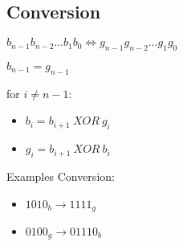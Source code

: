 \documentclass[11pt]{article}
\begin{document}
\subsection{Conversion}

$ b_{n - 1} b_{n - 2} \dots b_{1} b_0 \Longleftrightarrow g_{n - 1} g_{n - 2} \dots g_{1} g_0 $

$ b_{n - 1} = g_{n - 1} $ \newline

for $ i \neq n - 1 $:
\begin{itemize}
\item $ b_i = b_{i + 1} ~ XOR ~g_{i} $
\item $ g_i = b_{i + 1} ~ XOR ~ b_{i} $
\end{itemize}

Examples Conversion:
\begin{itemize}
\item $ 1010_b \rightarrow 1111_g $
\item $ 0100_g \rightarrow 01110_b $
\end{itemize}
\end{document}

